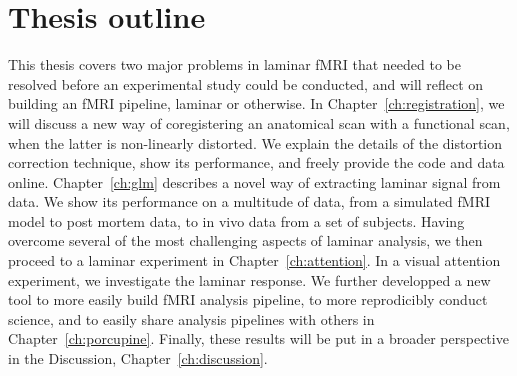 
\section*{Thesis outline}
This thesis covers two major problems in laminar fMRI that needed to be resolved before an experimental study could be conducted, and will reflect on building an fMRI pipeline, laminar or otherwise. In Chapter~\ref{ch:registration}, we will discuss a new way of coregistering an anatomical scan with a functional scan, when the latter is non-linearly distorted. We explain the details of the distortion correction technique, show its performance, and freely provide the code and data online. Chapter~\ref{ch:glm} describes a novel way of extracting laminar signal from data. We show its performance on a multitude of data, from a simulated fMRI model to post mortem data, to in vivo data from a set of subjects. Having overcome several of the most challenging aspects of laminar analysis, we then proceed to a laminar experiment in Chapter~\ref{ch:attention}. In a visual attention experiment, we investigate the laminar response. We further developped a new tool to more easily build fMRI analysis pipeline, to more reprodicibly conduct science, and to easily share analysis pipelines with others in Chapter~\ref{ch:porcupine}. Finally, these results will be put in a broader perspective in the Discussion, Chapter~\ref{ch:discussion}.